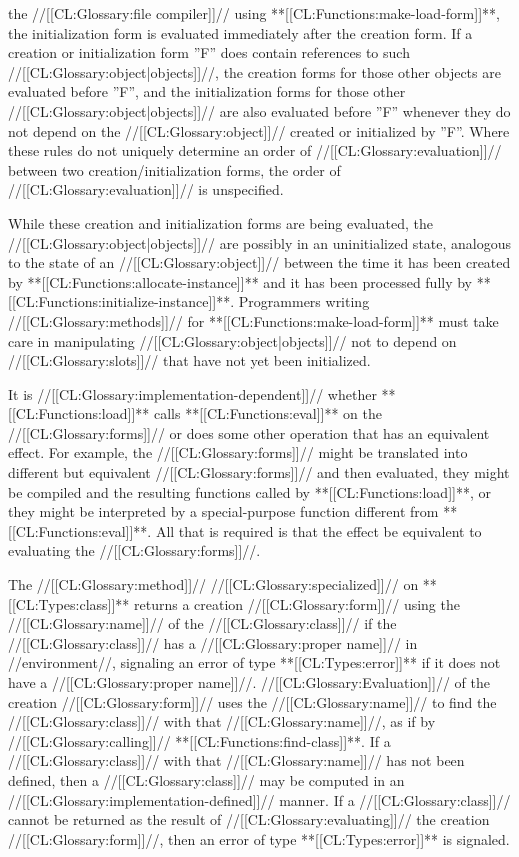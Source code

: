 the //[[CL:Glossary:file compiler]]// using **[[CL:Functions:make-load-form]]**, the initialization form is evaluated immediately after the creation form. If a creation or initialization form ''F'' does contain references to such //[[CL:Glossary:object|objects]]//, the creation forms for those other objects are evaluated before ''F'', and the initialization forms for those other //[[CL:Glossary:object|objects]]// are also evaluated before ''F'' whenever they do not depend on the //[[CL:Glossary:object]]// created or initialized by ''F''. Where these rules do not uniquely determine an order of //[[CL:Glossary:evaluation]]// between two creation/initialization forms, the order of //[[CL:Glossary:evaluation]]// is unspecified.

While these creation and initialization forms are being evaluated, the //[[CL:Glossary:object|objects]]// are possibly in an uninitialized state, analogous to the state of an //[[CL:Glossary:object]]// between the time it has been created by **[[CL:Functions:allocate-instance]]** and it has been processed fully by **[[CL:Functions:initialize-instance]]**. Programmers writing //[[CL:Glossary:methods]]// for **[[CL:Functions:make-load-form]]** must take care in manipulating //[[CL:Glossary:object|objects]]// not to depend on //[[CL:Glossary:slots]]// that have not yet been initialized.

It is //[[CL:Glossary:implementation-dependent]]// whether **[[CL:Functions:load]]** calls **[[CL:Functions:eval]]** on the //[[CL:Glossary:forms]]// or does some other operation that has an equivalent effect. For example, the //[[CL:Glossary:forms]]// might be translated into different but equivalent //[[CL:Glossary:forms]]// and then evaluated, they might be compiled and the resulting functions called by **[[CL:Functions:load]]**, or they might be interpreted by a special-purpose function different from **[[CL:Functions:eval]]**. All that is required is that the effect be equivalent to evaluating the //[[CL:Glossary:forms]]//.

The //[[CL:Glossary:method]]// //[[CL:Glossary:specialized]]// on **[[CL:Types:class]]** returns a creation //[[CL:Glossary:form]]// using the //[[CL:Glossary:name]]// of the //[[CL:Glossary:class]]// if the //[[CL:Glossary:class]]// has a //[[CL:Glossary:proper name]]// in //environment//, signaling an error of type **[[CL:Types:error]]** if it does not have a //[[CL:Glossary:proper name]]//. //[[CL:Glossary:Evaluation]]// of the creation //[[CL:Glossary:form]]// uses the //[[CL:Glossary:name]]// to find the //[[CL:Glossary:class]]// with that //[[CL:Glossary:name]]//, as if by //[[CL:Glossary:calling]]// **[[CL:Functions:find-class]]**. If a //[[CL:Glossary:class]]// with that //[[CL:Glossary:name]]// has not been defined, then a //[[CL:Glossary:class]]// may be computed in an //[[CL:Glossary:implementation-defined]]// manner. If a //[[CL:Glossary:class]]// cannot be returned as the result of //[[CL:Glossary:evaluating]]// the creation //[[CL:Glossary:form]]//, then an error of type **[[CL:Types:error]]** is signaled.

